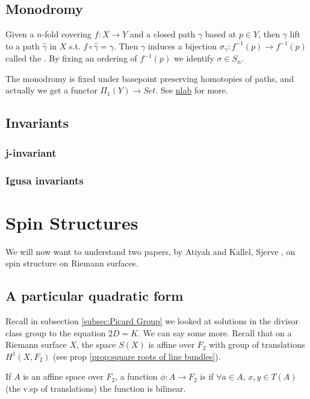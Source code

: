 \documentclass{article}
\begin{document}
\subsection{Monodromy}
\begin{definition}
	Given a $n$-fold covering $f:X \to Y$ and a closed path $\gamma$ based at $p \in Y$, then $\gamma$ lift to a path $\hat{\gamma}$ in $X$ s.t. $f \circ \hat{\gamma}=\gamma$. Then $\gamma$ induces a bijection $\sigma_\gamma : f^{-1}(p) \to f^{-1}(p)$ called the . By fixing an ordering of $f^{-1}(p)$ we identify $\sigma \in S_n$.  
\end{definition}
\begin{remark}
	The monodromy is fixed under basepoint preserving homotopies of paths, and actually we get a functor $\Pi_1(Y) \to Set$. See \href{https://ncatlab.org/nlab/show/monodromy}{nlab} for more. 
\end{remark}


\subsection{Invariants}
\subsubsection{j-invariant}
\subsubsection{Igusa invariants}

\section{Spin Structures}
We will now want to understand two papers, by Atiyah \cite{Atiyah1971} and Kallel, Sjerve \cite{Kallel2006}, on spin structure on Riemann surfaces. 
\subsection{A particular quadratic form}
Recall in subsection \ref{subsec:Picard Group} we looked at solutions in the divisor class group to the equation $2D=K$. We can say some more. Recall that on a Riemann surface $X$, the space $S(X)$ is affine over $F_2$ with group of translations $H^1(X,F_2)$ (see prop \ref{prop:square roots of line bundles}). 
\begin{definition}
	If $A$ is an affine space over $F_2$, a function $\phi:A \to F_2$ is  if $\forall a \in A, \, x,y \in T(A)$ (the v.sp of translations) the function 
is bilinear. 
\end{definition} 
\end{document}
